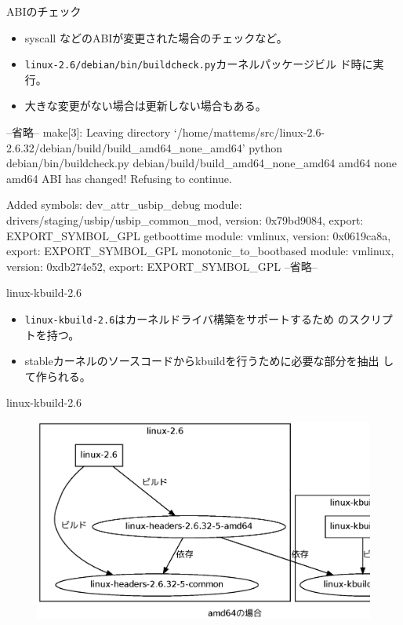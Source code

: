\begin{frame}[containsverbatim]{ABIのチェック}

\begin{itemize}
\item syscall などのABIが変更された場合のチェックなど。
\item \texttt{linux-2.6/debian/bin/buildcheck.py}カーネルパッケージビル
      ド時に実行。
\item 大きな変更がない場合は更新しない場合もある。
\end{itemize}

\begin{commandline}
--省略--
make[3]: Leaving directory  `/home/mattems/src/linux-2.6-2.6.32/debian/build/build_amd64_none_amd64'
python debian/bin/buildcheck.py debian/build/build_amd64_none_amd64 amd64 none amd64
ABI has changed!  Refusing to continue.

Added symbols:
dev_attr_usbip_debug    module: drivers/staging/usbip/usbip_common_mod, version: 0x79bd9084, export: EXPORT_SYMBOL_GPL 
getboottime             module: vmlinux, version: 0x0619ca8a, export: EXPORT_SYMBOL_GPL
monotonic_to_bootbased  module: vmlinux, version: 0xdb274e52, export: EXPORT_SYMBOL_GPL
--省略--
\end{commandline}
\end{frame}

\begin{frame}[containsverbatim]{linux-kbuild-2.6}
\begin{itemize}
\item \texttt{linux-kbuild-2.6}はカーネルドライバ構築をサポートするため
      のスクリプトを持つ。
\item stableカーネルのソースコードからkbuildを行うために必要な部分を抽出
      して作られる。
\end{itemize}
\end{frame}

\begin{frame}[containsverbatim]{linux-kbuild-2.6}
\begin{figure}[H]
\begin{center}
\includegraphics[width=1.0\hsize]{image201005/linux-kbuild-2.6.eps}
\end{center}
\end{figure}
\end{frame}

